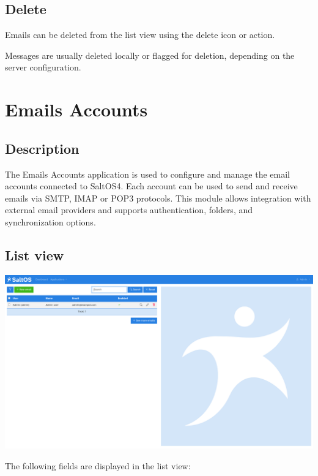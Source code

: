 \documentclass[a4paper]{article}
\begin{document}
\hypertarget{toc95}{}
\subsection{Delete}

Emails can be deleted from the list view using the delete icon or action.

Messages are usually deleted locally or flagged for deletion, depending on the server configuration.


\hypertarget{toc96}{}
\section{Emails Accounts}

\hypertarget{toc97}{}
\subsection{Description}

The Emails Accounts application is used to configure and manage the email accounts connected to SaltOS4.
Each account can be used to send and receive emails via SMTP, IMAP or POP3 protocols.
This module allows integration with external email providers and supports authentication, folders, and synchronization options.

\hypertarget{toc98}{}
\subsection{List view}

\begin{center}\includegraphics[width=1\textwidth]{../ujest/snaps/test-screenshots-js-screenshots-emails-emails-accounts-list-en-us-1-snap.png}\end{center}

The following fields are displayed in the list view:
\end{document}

